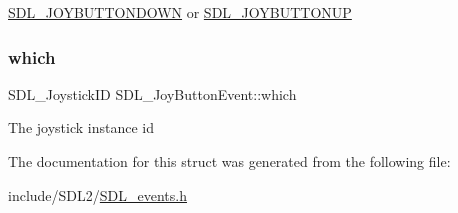 \hyperlink{_s_d_l__events_8h_a3b589e89be6b35c02e0dd34a55f3fccaa386ac978bc145a45883fe0adab70710b}{S\+D\+L\+\_\+\+J\+O\+Y\+B\+U\+T\+T\+O\+N\+D\+O\+WN} or \hyperlink{_s_d_l__events_8h_a3b589e89be6b35c02e0dd34a55f3fccaa76f91c81110f012e3a47cbbc0449e3c3}{S\+D\+L\+\_\+\+J\+O\+Y\+B\+U\+T\+T\+O\+N\+UP} \mbox{\label{struct_s_d_l___joy_button_event_a1679049adad7242b28420948fdc79044}} 
\subsubsection{\texorpdfstring{which}{which}}
{\footnotesize\ttfamily S\+D\+L\+\_\+\+Joystick\+ID S\+D\+L\+\_\+\+Joy\+Button\+Event\+::which}

The joystick instance id 

The documentation for this struct was generated from the following file\+:\begin{DoxyCompactItemize}
\item 
include/\+S\+D\+L2/\hyperlink{_s_d_l__events_8h}{S\+D\+L\+\_\+events.\+h}\end{DoxyCompactItemize}
